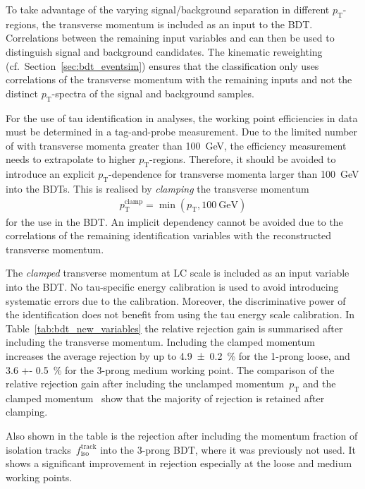 To take advantage of the varying signal/background separation in different
$p_\text{T}$-regions, the \tauhadvis transverse momentum is included as an input
to the BDT. Correlations between the remaining input variables and \tauhadvis
\pt can then be used to distinguish signal and background candidates. The
kinematic reweighting (cf.\ Section~\ref{sec:bdt_eventsim}) ensures that the
classification only uses correlations of the transverse momentum with the
remaining inputs and not the distinct $p_\text{T}$-spectra of the signal and
background samples.

For the use of tau identification in analyses, the working point efficiencies in
data must be determined in a tag-and-probe measurement. Due to the limited
number of \tauhadvis with transverse momenta greater than \SI{100}{\GeV}, the
efficiency measurement needs to extrapolate to higher $p_\text{T}$-regions.
Therefore, it should be avoided to introduce an explicit $p_\text{T}$-dependence
for transverse momenta larger than \SI{100}{\GeV} into the BDTs. This is
realised by \emph{clamping} the transverse momentum
\begin{align*}
  p_\text{T}^\text{clamp} = \min(p_\text{T}, \SI{100}{\giga\electronvolt})
\end{align*}
for the use in the BDT. An implicit dependency cannot be avoided due to the
correlations of the remaining identification variables with the reconstructed
transverse momentum.

The \emph{clamped} transverse momentum at LC scale is included as an input
variable into the BDT. No tau-specific energy calibration is used to avoid
introducing systematic errors due to the calibration. Moreover, the
discriminative power of the identification does not benefit from using the tau
energy scale calibration. In Table~\ref{tab:bdt_new_variables} the relative
rejection gain is summarised after including the transverse momentum. Including
the clamped momentum~ increases the average
rejection by up to \SI{4.9 +- 0.2}{\percent} for the 1-prong loose, and \SI{3.6
  +- 0.5}{\percent} for the 3-prong medium working point. The comparison of the
relative rejection gain after including the unclamped momentum~$p_\text{T}$ and
the clamped momentum~ show that the majority of
rejection is retained after clamping.

Also shown in the table is the rejection after including the momentum fraction
of isolation tracks~$f_\text{iso}^\text{track}$ into the 3-prong BDT, where it
was previously not used. It shows a significant improvement in rejection
especially at the loose and medium working points.

